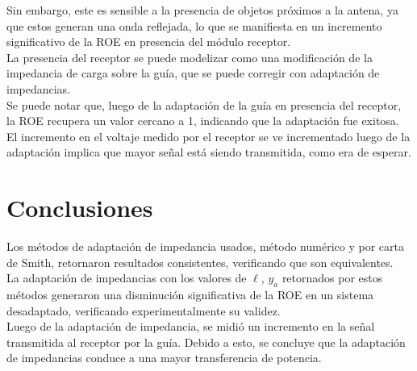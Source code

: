 \documentclass[11pt,a4paper]{article}
\begin{document}
\begin{multicols}{2}
Sin embargo, este es sensible a la presencia de objetos próximos a la antena, ya que estos generan una onda reflejada, lo que se manifiesta en un incremento significativo de la ROE en presencia del módulo receptor.\\

La presencia del receptor se puede modelizar como una modificación de la impedancia de carga sobre la guía, que se puede corregir con adaptación de impedancias.\\

Se puede notar que, luego de la adaptación de la guía en presencia del receptor, la ROE recupera un valor cercano a 1, indicando que la adaptación fue exitosa. \\

El incremento en el voltaje medido por el receptor se ve incrementado luego de la adaptación implica que mayor señal está siendo transmitida, como era de esperar.\\

\section{Conclusiones}

Los métodos de adaptación de impedancia usados, método numérico y por carta de Smith, retornaron resultados consistentes, verificando que son equivalentes.\\

La adaptación de impedancias con los valores de $\ell$, $y_a$ retornados por estos métodos generaron una disminución significativa de la ROE en un sistema desadaptado, verificando experimentalmente su validez.\\


Luego de la adaptación de impedancia, se midió un incremento en la señal transmitida al receptor por la guía. Debido a esto, se concluye que la adaptación de impedancias conduce a una mayor transferencia de potencia. \\





\end{multicols}
\newpage
\end{document}
